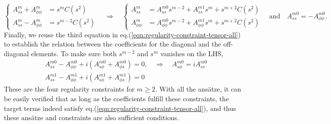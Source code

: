 \[
\left\{\begin{aligned}
    A_{ss}^m + A_{\phi \phi}^m &= s^{m} C(s^2) \\ 
    A_{ss}^m - A_{\phi \phi}^m &= s^{m-2} C(s^2)
\end{aligned}\right. \quad \Longrightarrow\quad 
\left\{\begin{aligned}
    A_{ss}^m &= A_{ss}^{m0} s^{m-2} + A_{ss}^{m1} s^{m} + s^{m+2} C(s^2) \\ 
    A_{\phi \phi}^m &= A_{\phi\phi}^{m0} s^{m-2} + A_{\phi\phi}^{m1} s^{m} + s^{m+2} C(s^2) 
\end{aligned}\right. \quad \mathrm{and} \quad A_{ss}^{m0} = - A_{\phi\phi}^{m0}.
\]
Finally, we reuse the third equation in eq.(\ref{eqn:regularity-constraint-tensor-all}) to establish the relation between the coefficients for the diagonal and the off-diagonal elements. To make sure both $s^{m-2}$ and $s^m$ vanishes on the LHS,
\[
\begin{aligned}
    A_{ss}^{m0} - A_{\phi\phi}^{m0} + i \left(A_{s\phi}^{m0} + A_{\phi s}^{m0}\right) = 0, \quad \Longrightarrow\quad A_{s\phi}^{m0} = i A_{ss}^{m0} \\
    A_{ss}^{m1} - A_{\phi\phi}^{m1} + i \left(A_{s\phi}^{m1} + A_{\phi s}^{m1}\right) = 0
\end{aligned}
\]
These are the four regularity constraints for $m\geq 2$. With all the ansätze, it can be easily verified that as long as the coefficients fulfill these constraints, the target terms indeed satisfy eq.(\ref{eqn:regularity-constraint-tensor-all}), and thus these ansätze and constraints are also sufficient conditions.

